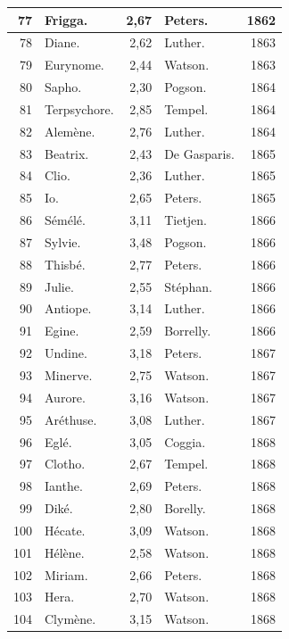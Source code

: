 \documentclass[a4paper, 11pt, oneside]{article}
\begin{document}
\begin{center}
\begin{longtable}{|r|l|r|l|r|}
        77 & Frigga. & 2,67 & Peters. & 1862 \\ \hline
        78 & Diane. & 2,62 & Luther. & 1863 \\ \hline
        79 & Eurynome. & 2,44 & Watson. & 1863 \\ \hline
        80 & Sapho. & 2,30 & Pogson. & 1864 \\ \hline
        81 & Terpsychore. & 2,85 & Tempel. & 1864 \\ \hline
        82 & Alemène. & 2,76 & Luther. & 1864 \\ \hline
        83 & Beatrix. & 2,43 & De Gasparis. & 1865 \\ \hline
        84 & Clio. & 2,36 & Luther. & 1865 \\ \hline
        85 & Io. & 2,65 & Peters. & 1865 \\ \hline
        86 & Sémélé. & 3,11 & Tietjen. & 1866 \\ \hline
        87 & Sylvie. & 3,48 & Pogson. & 1866 \\ \hline
        88 & Thisbé. & 2,77 & Peters. & 1866 \\ \hline
        89 & Julie. & 2,55 & Stéphan. & 1866 \\ \hline
        90 & Antiope. & 3,14 & Luther. & 1866 \\ \hline
        91 & Egine. & 2,59 & Borrelly. & 1866 \\ \hline
        92 & Undine. & 3,18 & Peters. & 1867 \\ \hline
        93 & Minerve. & 2,75 & Watson. & 1867 \\ \hline
        94 & Aurore. & 3,16 & Watson. & 1867 \\ \hline
        95 & Aréthuse. & 3,08 & Luther. & 1867 \\ \hline
        96 & Eglé. & 3,05 & Coggia. & 1868 \\ \hline
        97 & Clotho. & 2,67 & Tempel. & 1868 \\ \hline
        98 & Ianthe. & 2,69 & Peters. & 1868 \\ \hline
        99 & Diké. & 2,80 & Borelly. & 1868 \\ \hline
        100 & Hécate. & 3,09 & Watson. & 1868 \\ \hline
        101 & Hélène. & 2,58 & Watson. & 1868 \\ \hline
        102 & Miriam. & 2,66 & Peters. & 1868 \\ \hline
        103 & Hera. & 2,70 & Watson. & 1868 \\ \hline
        104 & Clymène. & 3,15 & Watson. & 1868 \\ \hline

\end{longtable}
\end{center}
\end{document}
